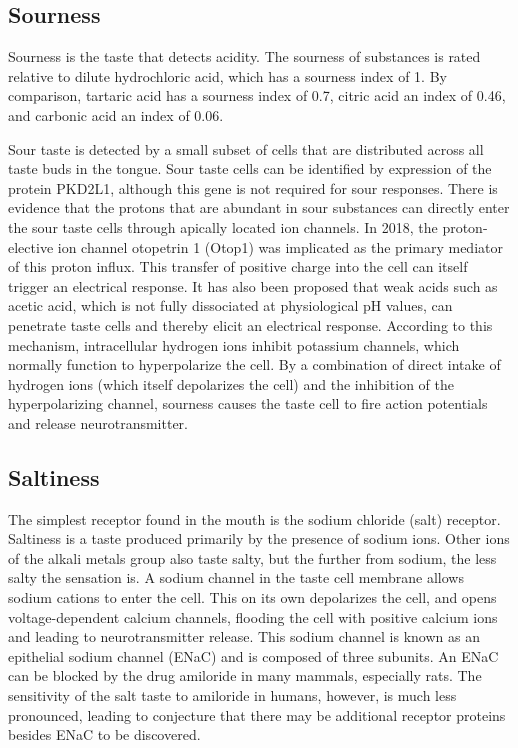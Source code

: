 \hypertarget{sourness}{%
\subsection{Sourness}\label{sourness}}

Sourness is the taste that detects acidity. The sourness of substances is rated relative to dilute hydrochloric acid, which has a sourness index of 1. By comparison, tartaric acid has a sourness index of 0.7, citric acid an index of 0.46, and carbonic acid an index of 0.06.

Sour taste is detected by a small subset of cells that are distributed across all taste buds in the tongue. Sour taste cells can be identified by expression of the protein PKD2L1, although this gene is not required for sour responses. There is evidence that the protons that are abundant in sour substances can directly enter the sour taste cells through apically located ion channels. In 2018, the proton-elective ion channel otopetrin 1 (Otop1) was implicated as the primary mediator of this proton influx. This transfer of positive charge into the cell can itself trigger an electrical response. It has also been proposed that weak acids such as acetic acid, which is not fully dissociated at physiological pH values, can penetrate taste cells and thereby elicit an electrical response. According to this mechanism, intracellular hydrogen ions inhibit potassium channels, which normally function to hyperpolarize the cell. By a combination of direct intake of hydrogen ions (which itself depolarizes the cell) and the inhibition of the hyperpolarizing channel, sourness causes the taste cell to fire action potentials and release neurotransmitter.

\hypertarget{saltiness}{%
\subsection{Saltiness}\label{saltiness}}

The simplest receptor found in the mouth is the sodium chloride (salt) receptor. Saltiness is a taste produced primarily by the presence of sodium ions. Other ions of the alkali metals group also taste salty, but the further from sodium, the less salty the sensation is. A sodium channel in the taste cell membrane allows sodium cations to enter the cell. This on its own depolarizes the cell, and opens voltage-dependent calcium channels, flooding the cell with positive calcium ions and leading to neurotransmitter release. This sodium channel is known as an epithelial sodium channel (ENaC) and is composed of three subunits. An ENaC can be blocked by the drug amiloride in many mammals, especially rats. The sensitivity of the salt taste to amiloride in humans, however, is much less pronounced, leading to conjecture that there may be additional receptor proteins besides ENaC to be discovered.

